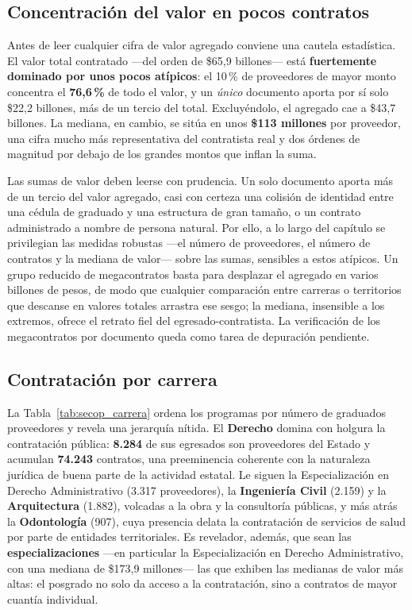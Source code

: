 \subsection{Concentración del valor en pocos contratos}
Antes de leer cualquier cifra de valor agregado conviene una cautela estadística. El valor total contratado ---del orden de \$65,9 billones--- está \textbf{fuertemente dominado por unos pocos atípicos}: el 10\,\% de proveedores de mayor monto concentra el \textbf{76,6\,\%} de todo el valor, y un \emph{único} documento aporta por sí solo \$22,2 billones, más de un tercio del total. Excluyéndolo, el agregado cae a \$43,7 billones. La mediana, en cambio, se sitúa en unos \textbf{\$113 millones} por proveedor, una cifra mucho más representativa del contratista real y dos órdenes de magnitud por debajo de los grandes montos que inflan la suma.

\begin{cajaobs}
Las sumas de valor deben leerse con prudencia. Un solo documento aporta más de un tercio del valor agregado, casi con certeza una colisión de identidad entre una cédula de graduado y una estructura de gran tamaño, o un contrato administrado a nombre de persona natural. Por ello, a lo largo del capítulo se privilegian las medidas robustas ---el número de proveedores, el número de contratos y la mediana de valor--- sobre las sumas, sensibles a estos atípicos. Un grupo reducido de megacontratos basta para desplazar el agregado en varios billones de pesos, de modo que cualquier comparación entre carreras o territorios que descanse en valores totales arrastra ese sesgo; la mediana, insensible a los extremos, ofrece el retrato fiel del egresado-contratista. La verificación de los megacontratos por documento queda como tarea de depuración pendiente.
\end{cajaobs}

\subsection{Contratación por carrera}
La Tabla~\ref{tab:secop_carrera} ordena los programas por número de graduados proveedores y revela una jerarquía nítida. El \textbf{Derecho} domina con holgura la contratación pública: \textbf{8.284} de sus egresados son proveedores del Estado y acumulan \textbf{74.243} contratos, una preeminencia coherente con la naturaleza jurídica de buena parte de la actividad estatal. Le siguen la Especialización en Derecho Administrativo (3.317 proveedores), la \textbf{Ingeniería Civil} (2.159) y la \textbf{Arquitectura} (1.882), volcadas a la obra y la consultoría públicas, y más atrás la \textbf{Odontología} (907), cuya presencia delata la contratación de servicios de salud por parte de entidades territoriales. Es revelador, además, que sean las \textbf{especializaciones} ---en particular la Especialización en Derecho Administrativo, con una mediana de \$173,9 millones--- las que exhiben las medianas de valor más altas: el posgrado no solo da acceso a la contratación, sino a contratos de mayor cuantía individual.


